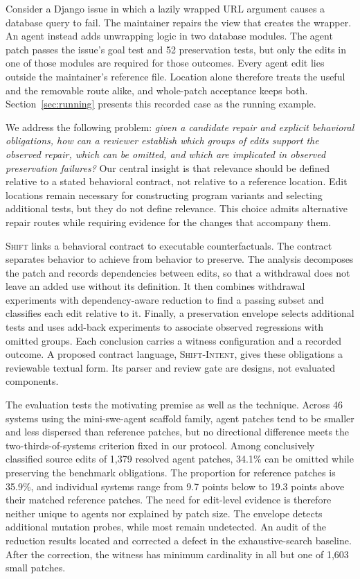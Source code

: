 \documentclass[a4paper,fleqn]{cas-sc}
\newcommand{\tool}{\textsc{Shift}}
\newcommand{\dsl}{\textsc{Shift-Intent}}
\begin{document}
Consider a Django issue in which a lazily wrapped URL argument causes a database query to fail. The maintainer repairs the view that creates the wrapper. An agent instead adds unwrapping logic in two database modules. The agent patch passes the issue's goal test and 52 preservation tests, but only the edits in one of those modules are required for those outcomes. Every agent edit lies outside the maintainer's reference file. Location alone therefore treats the useful and the removable route alike, and whole-patch acceptance keeps both. Section~\ref{sec:running} presents this recorded case as the running example.

We address the following problem: \emph{given a candidate repair and explicit behavioral obligations, how can a reviewer establish which groups of edits support the observed repair, which can be omitted, and which are implicated in observed preservation failures?} Our central insight is that relevance should be defined relative to a stated behavioral contract, not relative to a reference location. Edit locations remain necessary for constructing program variants and selecting additional tests, but they do not define relevance. This choice admits alternative repair routes while requiring evidence for the changes that accompany them.

\tool{} links a behavioral contract to executable counterfactuals. The contract separates behavior to achieve from behavior to preserve. The analysis decomposes the patch and records dependencies between edits, so that a withdrawal does not leave an added use without its definition. It then combines withdrawal experiments with dependency-aware reduction to find a passing subset and classifies each edit relative to it. Finally, a preservation envelope selects additional tests and uses add-back experiments to associate observed regressions with omitted groups. Each conclusion carries a witness configuration and a recorded outcome. A proposed contract language, \dsl{}, gives these obligations a reviewable textual form. Its parser and review gate are designs, not evaluated components.

The evaluation tests the motivating premise as well as the technique. Across 46 systems using the mini-swe-agent scaffold family, agent patches tend to be smaller and less dispersed than reference patches, but no directional difference meets the two-thirds-of-systems criterion fixed in our protocol. Among conclusively classified source edits of 1,379 resolved agent patches, 34.1\% can be omitted while preserving the benchmark obligations. The proportion for reference patches is 35.9\%, and individual systems range from 9.7 points below to 19.3 points above their matched reference patches. The need for edit-level evidence is therefore neither unique to agents nor explained by patch size. The envelope detects additional mutation probes, while most remain undetected. An audit of the reduction results located and corrected a defect in the exhaustive-search baseline. After the correction, the witness has minimum cardinality in all but one of 1,603 small patches.
\end{document}
